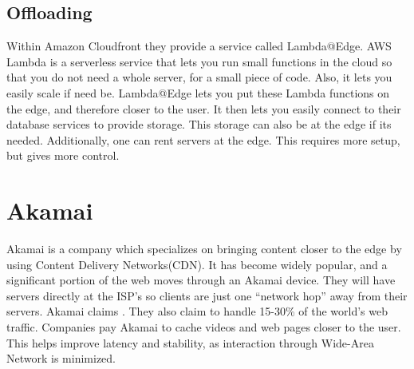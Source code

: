 \subsection{Offloading}
Within Amazon Cloudfront they provide a service called Lambda@Edge. AWS Lambda is a serverless service that lets you run small functions in the cloud so that you do not need a whole server, for a small piece of code. Also, it lets you easily scale if need be. Lambda@Edge lets you put these Lambda functions on the edge, and therefore closer to the user. It then lets you easily connect to their database services to provide storage. This storage can also be at the edge if its needed. Additionally, one can rent servers at the edge. This requires more setup, but gives more control.




\section{Akamai}
Akamai is a company which specializes on bringing content closer to the edge by using Content Delivery Networks(CDN). It has become widely popular, and a significant portion of the web moves through an Akamai device. They will have servers directly at the ISP’s so clients are just one “network hop” away from their servers. Akamai\cite{noauthor_exceptional_nodate} claims . They also claim to handle 15-30\% of the world's web traffic. Companies pay Akamai to cache videos and web pages closer to the user. This helps improve latency and stability, as interaction through Wide-Area Network is minimized. 

